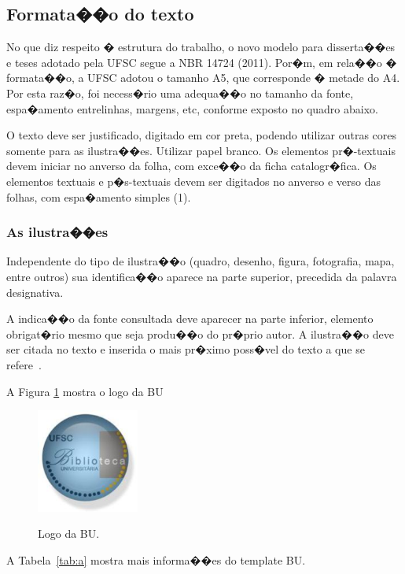 \documentclass{ufscThesis} %
\begin{document}
\subsection{Formata��o do texto}

No que diz respeito � estrutura do trabalho, o novo modelo para disserta��es e teses adotado pela UFSC segue a NBR 14724 (2011). Por�m, em rela��o � formata��o, a UFSC adotou o tamanho A5, que corresponde � metade do A4. Por esta raz�o, foi necess�rio uma adequa��o no tamanho da fonte, espa�amento entrelinhas, margens, etc, conforme exposto no quadro abaixo.

O texto deve ser justificado, digitado em cor preta, podendo utilizar outras cores somente para as ilustra��es. Utilizar papel branco. Os elementos pr�-textuais devem iniciar no anverso da folha, com  exce��o da ficha catalogr�fica. Os elementos textuais e p�s-textuais devem ser digitados no anverso e verso das folhas, com espa�amento simples (1). 



\subsubsection{As ilustra��es}

Independente do tipo de ilustra��o (quadro, desenho, figura, fotografia, mapa, entre outros) sua identifica��o aparece na parte superior, precedida da palavra designativa. 



A indica��o da fonte consultada deve aparecer na parte inferior, elemento obrigat�rio mesmo que seja produ��o do pr�prio autor. A ilustra��o deve ser citada no texto e inserida o mais pr�ximo poss�vel do texto a que se refere~\cite{abnt14724}. 

A Figura \ref{fig:a} mostra o logo da BU
\begin{figure}[!htb]
   \centering
   \caption{Logo da BU.}
   \includegraphics[width=0.3\textwidth]{figuras/brasaoBU.jpg}
     \label{fig:a}
\end{figure}

A Tabela~\ref{tab:a} mostra mais informa��es do template BU.
\end{document}
